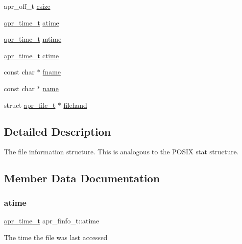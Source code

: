 \begin{DoxyCompactItemize}
\item 
apr\+\_\+off\+\_\+t \mbox{\hyperlink{structapr__finfo__t_aeaa4a4def98ad4f162e05c2e2292321d}{csize}}
\item 
\mbox{\hyperlink{group__apr__time_gadb4bde16055748190eae190c55aa02bb}{apr\+\_\+time\+\_\+t}} \mbox{\hyperlink{structapr__finfo__t_ad78874e5751e9bba30debb0826eb96a7}{atime}}
\item 
\mbox{\hyperlink{group__apr__time_gadb4bde16055748190eae190c55aa02bb}{apr\+\_\+time\+\_\+t}} \mbox{\hyperlink{structapr__finfo__t_afc3bec0f6b3b10160428ba5602a41c60}{mtime}}
\item 
\mbox{\hyperlink{group__apr__time_gadb4bde16055748190eae190c55aa02bb}{apr\+\_\+time\+\_\+t}} \mbox{\hyperlink{structapr__finfo__t_aebbdb3dc755d825de3dce901cfba0883}{ctime}}
\item 
const char $\ast$ \mbox{\hyperlink{structapr__finfo__t_acfed83ab2943ee7a58a215aa1cfd9e47}{fname}}
\item 
const char $\ast$ \mbox{\hyperlink{structapr__finfo__t_a2915f9141ea76ae3672ccf9eb0fa77bb}{name}}
\item 
struct \mbox{\hyperlink{structapr__file__t}{apr\+\_\+file\+\_\+t}} $\ast$ \mbox{\hyperlink{structapr__finfo__t_a7858e3d9c5f6ed062d9ff7f5c79b6336}{filehand}}
\end{DoxyCompactItemize}


\subsection{Detailed Description}
The file information structure. This is analogous to the P\+O\+S\+IX stat structure. 

\subsection{Member Data Documentation}
\mbox{\label{structapr__finfo__t_ad78874e5751e9bba30debb0826eb96a7}} 
\subsubsection{\texorpdfstring{atime}{atime}}
{\footnotesize\ttfamily \mbox{\hyperlink{group__apr__time_gadb4bde16055748190eae190c55aa02bb}{apr\+\_\+time\+\_\+t}} apr\+\_\+finfo\+\_\+t\+::atime}

The time the file was last accessed \mbox{\label{structapr__finfo__t_aeaa4a4def98ad4f162e05c2e2292321d}} 

